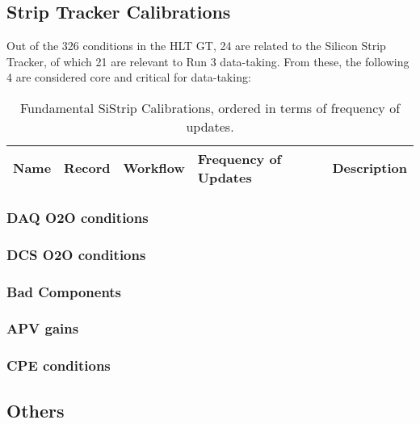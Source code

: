 \subsection{Strip Tracker Calibrations}

Out of the 326 conditions in the HLT GT, 24 are related to the Silicon Strip Tracker, of which 21 are relevant to Run 3 data-taking. From these, the following 4 are considered core and critical for data-taking:

\begin{table}[h!]
    \centering
    \begin{adjustbox}{max width=\textwidth}
    \begin{tabular}{p{3.5cm}|p{4cm}|p{2.5cm}|p{2cm}|p{4.5cm}}
        \textbf{Name} & \textbf{Record} & \textbf{Workflow} & \textbf{Frequency of Updates} & \textbf{Description} \\ \hline
    \end{tabular}
    \end{adjustbox}
    \caption{Fundamental SiStrip Calibrations, ordered in terms of frequency of updates.}
    \label{tab:StripCalibrations_critical}
\end{table}

\subsubsection{DAQ O2O conditions}

\subsubsection{DCS O2O conditions}

\subsubsection{Bad Components}

\subsubsection{APV gains}

\subsubsection{CPE conditions}

\subsection{Others}
